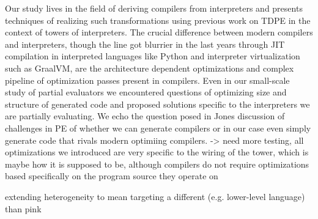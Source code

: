 \documentclass{article}
\theoremstyle{definition}
\begin{document}

Our study lives in the field of deriving compilers from interpreters and presents techniques of realizing such transformations using previous work on TDPE in the context of towers of interpreters. The crucial difference between modern compilers and interpreters, though the line got blurrier in the last years through JIT compilation in interpreted languages like Python and interpreter virtualization such as GraalVM, are the architecture dependent optimizations and complex pipeline of optimization passes present in compilers. Even in our small-scale study of partial evaluators we encountered questions of optimizing size and structure of generated code and proposed solutions specific to the interpreters we are partially evaluating. We echo the question posed in Jones \cite{jones1988challenging} discussion of challenges in PE of whether we can generate compilers or in our case even simply generate code that rivals modern optimiing compilers. -> need more testing, all optimizations we introduced are very specific to the wiring of the tower, which is maybe how it is supposed to be, although compilers do not require optimizations based specifically on the program source they operate on

extending heterogeneity to mean targeting a different (e.g. lower-level language) than pink



\end{document}
